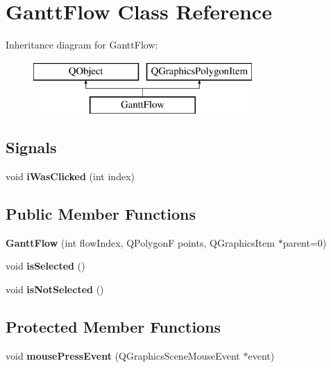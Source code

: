 \hypertarget{class_gantt_flow}{}\section{Gantt\+Flow Class Reference}
\label{class_gantt_flow}
Inheritance diagram for Gantt\+Flow\+:\begin{figure}[H]
\begin{center}
\leavevmode
\includegraphics[height=2.000000cm]{class_gantt_flow}
\end{center}
\end{figure}
\subsection*{Signals}
\begin{DoxyCompactItemize}
\item 
\hypertarget{class_gantt_flow_ac70e8aa9713b3f9491c005e432b27cf3}{}void {\bfseries i\+Was\+Clicked} (int index)\label{class_gantt_flow_ac70e8aa9713b3f9491c005e432b27cf3}

\end{DoxyCompactItemize}
\subsection*{Public Member Functions}
\begin{DoxyCompactItemize}
\item 
\hypertarget{class_gantt_flow_a049bba5800cffb959fc25b956611e0dd}{}{\bfseries Gantt\+Flow} (int flow\+Index, Q\+Polygon\+F points, Q\+Graphics\+Item $\ast$parent=0)\label{class_gantt_flow_a049bba5800cffb959fc25b956611e0dd}

\item 
\hypertarget{class_gantt_flow_aa15236657e635084fdd7d17209949fcd}{}void {\bfseries is\+Selected} ()\label{class_gantt_flow_aa15236657e635084fdd7d17209949fcd}

\item 
\hypertarget{class_gantt_flow_a5b4f74ffc39282abc9d109f104031201}{}void {\bfseries is\+Not\+Selected} ()\label{class_gantt_flow_a5b4f74ffc39282abc9d109f104031201}

\end{DoxyCompactItemize}
\subsection*{Protected Member Functions}
\begin{DoxyCompactItemize}
\item 
\hypertarget{class_gantt_flow_a71c4e6b658663c3bf916bf9eadc444e3}{}void {\bfseries mouse\+Press\+Event} (Q\+Graphics\+Scene\+Mouse\+Event $\ast$event)\label{class_gantt_flow_a71c4e6b658663c3bf916bf9eadc444e3}

\end{DoxyCompactItemize}
